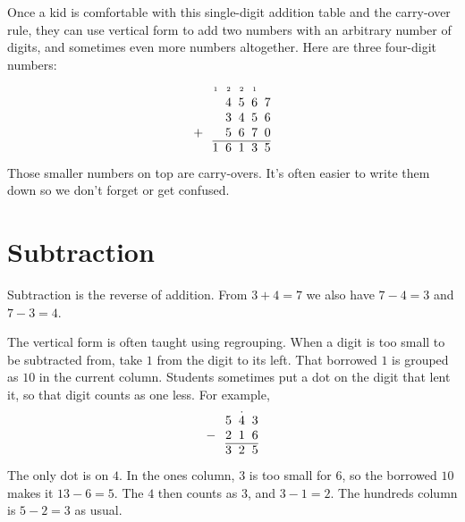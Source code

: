 Once a kid is comfortable with this single-digit addition table and the carry-over rule, they can use vertical form to add two numbers with an arbitrary number of digits, and sometimes even more numbers altogether. Here are three four-digit numbers:
\[
  \begin{array}{@{}c@{\hspace{0.75em}}c@{\hspace{0.55em}}c@{\hspace{0.55em}}c@{\hspace{0.55em}}c@{\hspace{0.55em}}c@{}}
      & {\scriptscriptstyle 1} & {\scriptscriptstyle 2} & {\scriptscriptstyle 2} & {\scriptscriptstyle 1} & \\
      & & 4 & 5 & 6 & 7 \\
      & & 3 & 4 & 5 & 6 \\
    + & & 5 & 6 & 7 & 0 \\
    \cline{2-6}
      & 1 & 6 & 1 & 3 & 5
  \end{array}
\]
Those smaller numbers on top are carry-overs. It's often easier to write them down so we don't forget or get confused.

\section{Subtraction}

Subtraction is the reverse of addition. From $3 + 4 = 7$ we also have $7 - 4 = 3$ and $7 - 3 = 4$.

The vertical form is often taught using regrouping. When a digit is too small to be subtracted from, take $1$ from the digit to its left. That borrowed $1$ is grouped as $10$ in the current column. Students sometimes put a dot on the digit that lent it, so that digit counts as one less. For example,
\[
  \begin{array}{@{}c@{\hspace{0.75em}}c@{\hspace{0.55em}}c@{\hspace{0.55em}}c@{}}
      & 5 & \mbox{\shortstack{.\\4}} & 3 \\
    - & 2 & 1 & 6 \\
    \cline{2-4}
      & 3 & 2 & 5
  \end{array}
\]
The only dot is on $4$. In the ones column, $3$ is too small for $6$, so the borrowed $10$ makes it $13 - 6 = 5$. The $4$ then counts as $3$, and $3 - 1 = 2$. The hundreds column is $5 - 2 = 3$ as usual.

